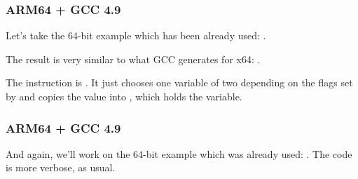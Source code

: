 \subsubsection{ARM64 + \Optimizing GCC 4.9}

Let's take the 64-bit example which has been already used: .



The result is very similar to what GCC generates for x64: .

The \CSEL instruction is . 
It just chooses one variable of two depending on the flags set by \TST and copies the value into , which holds the  variable.

\subsubsection{ARM64 + \NonOptimizing GCC 4.9}

And again, we'll work on the 64-bit example which was already used: .
The code is more verbose, as usual.



